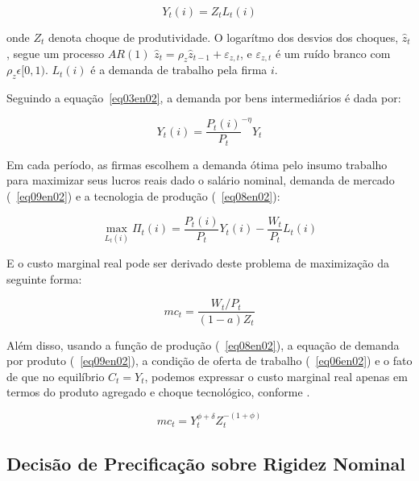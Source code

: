 \documentclass[twoside,a4paper,11pt]{report}
\begin{document}
\begin{equation}\label{eq08en02}
Y_{t}(i)=Z_{t}L_{t}(i)
\end{equation}

\noindent onde $Z_{t}$ denota choque de produtividade. O logarítmo dos desvios dos choques, ${\hat{z}}_{t}$, segue um processo $AR(1)$ ${\hat{z}}_{t}={\rho}_{z}{\hat{z}}_{t-1}+{\varepsilon}_{z,t}$, e ${\varepsilon}_{z,t}$ é um ruído branco com ${\rho}_{z}\epsilon [0,1)$. $L_{t}(i)$ é a demanda de trabalho pela firma $i$. 

Seguindo a equação~\ref{eq03en02}, a demanda por bens intermediários é dada por:

\begin{equation}\label{eq09en02}
{Y}_{t}(i)={\frac{{P}_{t}(i)}{{P}_{t}}}^{-\eta}{Y}_{t}
\end{equation}

Em cada período, as firmas escolhem a demanda ótima pelo insumo trabalho para maximizar seus lucros reais dado o salário nominal, demanda de mercado (~\ref{eq09en02}) e a tecnologia de produção (~\ref{eq08en02}):

\begin{equation}\label{eq10en02}
\max _{{L}_{t}(i)}{{{\Pi}_{t}(i)}}=\frac{{P}_{t}(i)}{{P}_{t}}{Y}_{t}(i)-\frac{{W}_{t}}{{P}_{t}}{L}_{t}(i)
\end{equation}

E o custo marginal real pode ser derivado deste problema de maximização da seguinte forma:

\begin{equation}\label{eq11en02}
{mc}_{t}=\frac{{{W}_{t}}/{{P}_{t}}}{(1-a){Z}_{t}} 
\end{equation}

Além disso, usando a função de produção (~\ref{eq08en02}), a equação de demanda por produto (~\ref{eq09en02}), a condição de oferta de trabalho (~\ref{eq06en02}) e o fato de que no equilíbrio $C_{t}=Y_{t}$, podemos expressar o custo marginal real apenas em termos do produto agregado e choque tecnológico, conforme \citet{yao2010aggregate}. 

\begin{equation}\label{eq12en02}
{mc}_{t}={Y}_{t}^{\phi +\delta}{Z}_{t}^{-(1+\phi)}
\end{equation}

\subsection*{Decisão de Precificação sobre Rigidez Nominal}
\end{document}
